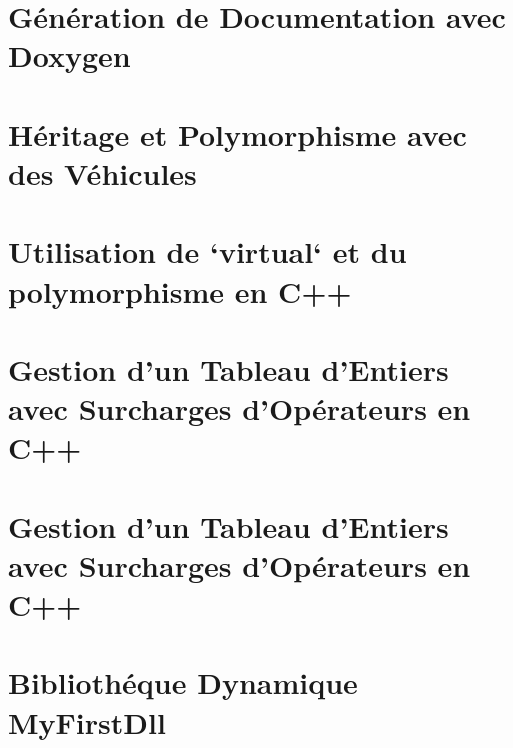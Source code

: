 \documentclass[twoside]{book}
\newcommand{\+}{\discretionary{\mbox{\scriptsize$\hookleftarrow$}}{}{}}
\begin{document}
\chapter{Génération de Documentation avec Doxygen}
\label{md_prog_C_vers_C_09_09_cheatsheet_README_doxygen}

\chapter{Héritage et Polymorphisme avec des Véhicules}
\label{md_prog_C_vers_C_09_09_classes_exo4_voiture_heritage_polymorphisme_README}

\chapter{Utilisation de `virtual` et du polymorphisme en C++}
\label{md_prog_C_vers_C_09_09_classes_exo4_voiture_heritage_polymorphisme_VIRTUAL_et_polymorphisme_C_09_09}

\chapter{Gestion d’un Tableau d’\+Entiers avec Surcharges d’\+Opérateurs en C++}
\label{md_prog_C_vers_C_09_09_classes_exo5_operator_tableau_README}

\chapter{Gestion d’un Tableau d’\+Entiers avec Surcharges d’\+Opérateurs en C++}
\label{md_prog_C_vers_C_09_09_classes_exo5_operator_tableau_copy_README}

\chapter{Bibliothéque Dynamique My\+First\+Dll}
\label{md_prog_C_vers_C_09_09_librairies_librairie_dynamique_README}

\end{document}
